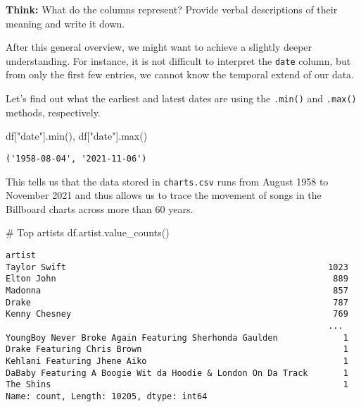 \documentclass[
  a4paper,
]{scrbook}
\newenvironment{Shaded}{\begin{snugshade}}{\end{snugshade}}
\newcommand{\BuiltInTok}[1]{\textcolor[rgb]{0.00,0.23,0.31}{#1}}
\newcommand{\CommentTok}[1]{\textcolor[rgb]{0.37,0.37,0.37}{#1}}
\newcommand{\NormalTok}[1]{\textcolor[rgb]{0.00,0.23,0.31}{#1}}
\newcommand{\StringTok}[1]{\textcolor[rgb]{0.13,0.47,0.30}{#1}}
\begin{document}
\textbf{Think:} What do the columns represent? Provide verbal
descriptions of their meaning and write it down.

After this general overview, we might want to achieve a slightly deeper
understanding. For instance, it is not difficult to interpret the
\texttt{date} column, but from only the first few entries, we cannot
know the temporal extend of our data.

Let's find out what the earliest and latest dates are using the
\texttt{.min()} and \texttt{.max()} methods, respectively.

\begin{Shaded}
\begin{Highlighting}[]
\NormalTok{df[}\StringTok{"date"}\NormalTok{].}\BuiltInTok{min}\NormalTok{(), df[}\StringTok{"date"}\NormalTok{].}\BuiltInTok{max}\NormalTok{()}
\end{Highlighting}
\end{Shaded}

\begin{verbatim}
('1958-08-04', '2021-11-06')
\end{verbatim}

This tells us that the data stored in \texttt{charts.csv} runs from
August 1958 to November 2021 and thus allows us to trace the movement of
songs in the Billboard charts across more than 60 years.

\begin{Shaded}
\begin{Highlighting}[]
\CommentTok{\# Top artists}
\NormalTok{df.artist.value\_counts()}
\end{Highlighting}
\end{Shaded}

\begin{verbatim}
artist
Taylor Swift                                                    1023
Elton John                                                       889
Madonna                                                          857
Drake                                                            787
Kenny Chesney                                                    769
                                                                ... 
YoungBoy Never Broke Again Featuring Sherhonda Gaulden             1
Drake Featuring Chris Brown                                        1
Kehlani Featuring Jhene Aiko                                       1
DaBaby Featuring A Boogie Wit da Hoodie & London On Da Track       1
The Shins                                                          1
Name: count, Length: 10205, dtype: int64
\end{verbatim}
\end{document}
